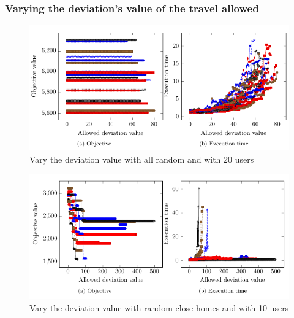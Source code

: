 \documentclass[12pt, a4paper, twoside]{memoir}
\begin{document}
{	
	\subsubsection{Varying the deviation's value of the travel allowed}
	
	\begin{figure}[H]
		\centering
		\begin{flushleft}
			\includegraphics[scale=0.9]{img/compiledResults/8.png}
		\end{flushleft}
		\caption{Vary the deviation value with all random and with 20 users}
		\label{fig:Vary the deviation value with all random and with 20 users}
	\end{figure}
	
	\begin{figure}[H]
		\centering
		\begin{flushleft}
			\floatplacement{figure}{t}
			\includegraphics[scale=0.9]{img/compiledResults/9.png}
		\end{flushleft}
		\caption{Vary the deviation value with random close homes and with 10 users}
		\label{fig:Vary the deviation value with random close homes and with 10 users}
	\end{figure}



}
\end{document}
